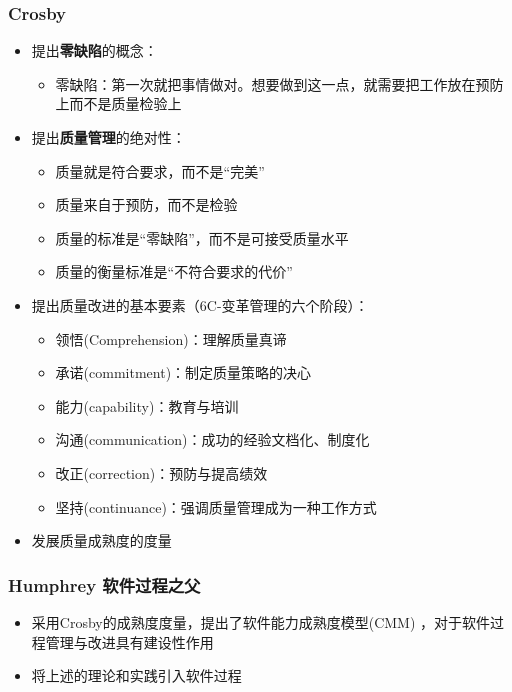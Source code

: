 \subsubsection{Crosby}
\begin{itemize}
    \item 提出\textbf{零缺陷}的概念：
    \begin{itemize}
        \item 零缺陷：第一次就把事情做对。想要做到这一点，就需要把工作放在预防上而不是质量检验上
    \end{itemize}
    \item 提出\textbf{质量管理}的绝对性：
    \vspace{-0.8em}
    \begin{multicols}{2}
        \begin{itemize}
            \item 质量就是符合要求，而不是“完美”
            \item 质量来自于预防，而不是检验
            \item 质量的标准是“零缺陷”，而不是可接受质量水平
            \item 质量的衡量标准是“不符合要求的代价”
        \end{itemize}
    \end{multicols}
    \vspace{-1em}
    \item 提出质量改进的基本要素（6C-变革管理的六个阶段）：
    \vspace{-0.8em}
    \begin{multicols}{2}
        \begin{itemize}
            \item 领悟(Comprehension)：理解质量真谛
            \item 承诺(commitment)：制定质量策略的决心
            \item 能力(capability)：教育与培训
            \item 沟通(communication)：成功的经验文档化、制度化
            \item 改正(correction)：预防与提高绩效
            \item 坚持(continuance)：强调质量管理成为一种工作方式
        \end{itemize}
    \end{multicols}
    \vspace{-1em}
    \item 发展质量成熟度的度量
\end{itemize}


\subsubsection{Humphrey 软件过程之父}
\begin{itemize}
    \item 采用Crosby的成熟度度量，提出了软件能力成熟度模型(CMM) ，对于软件过程管理与改进具有建设性作用
    \item 将上述的理论和实践引入软件过程
\end{itemize}

